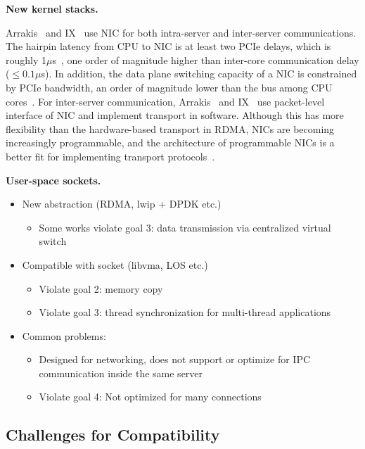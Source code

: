 \textbf{New kernel stacks.}



Arrakis~\cite{peter2016arrakis} and IX~\cite{belay2017ix} use NIC for both intra-server and inter-server communications. The hairpin latency from CPU to NIC is at least two PCIe delays, which is roughly 1$\mu$s~\cite{kaminsky2016design}, one order of magnitude higher than inter-core communication delay ($\leq0.1\mu$s). In addition, the data plane switching capacity of a NIC is constrained by PCIe bandwidth, an order of magnitude lower than the bus among CPU cores~\cite{li2017kv}. For inter-server communication, Arrakis~\cite{peter2016arrakis} and IX~\cite{belay2017ix} use packet-level interface of NIC and implement transport in software. Although this has more flexibility than the hardware-based transport in RDMA, NICs are becoming increasingly programmable, and the architecture of programmable NICs is a better fit for implementing transport protocols~\cite{kaufmann2015flexnic,smartnic,mellanox,cavium}. 

\textbf{User-space sockets.}


\begin{itemize}
\item New abstraction (RDMA, lwip + DPDK etc.) 
\begin{itemize}
	\item Some works violate goal 3: data transmission via centralized virtual switch 
\end{itemize}
\item Compatible with socket (libvma, LOS etc.) 
\begin{itemize}
	\item Violate goal 2: memory copy 
	\item Violate goal 3: thread synchronization for multi-thread applications 
\end{itemize}
\item Common problems: 
\begin{itemize}
	\item Designed for networking, does not support or optimize for IPC communication inside the same server 
	\item Violate goal 4: Not optimized for many connections 
\end{itemize}
\end{itemize}



\subsection{Challenges for Compatibility}
\label{subsec:challenges}

